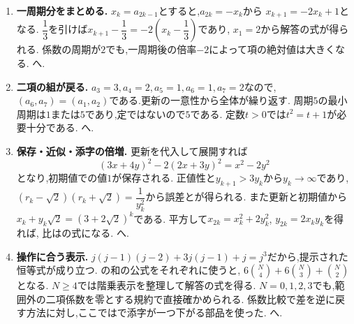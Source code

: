 \begin{enumerate}[label=\textbf{問\arabic*.},format=\bookitemlink{practice-connections}{solution}{problem}]
      へ.
    \item \textbf{一周期分をまとめる.}
      $x_k=a_{2k-1}$とすると,$a_{2k}=-x_k$から
      $x_{k+1}=-2x_k+1$となる.
      $\dfrac{1}{3}$を引けば$x_{k+1}-\dfrac{1}{3}=-2\left(x_k-\dfrac{1}{3}\right)$であり,
      $x_1=2$から解答の式が得られる.
      係数の周期が$2$でも,一周期後の倍率$-2$によって項の絶対値は大きくなる.
      へ.
    \item \textbf{二項の組が戻る.}
      $a_3=3,a_4=2,a_5=1,a_6=1,a_7=2$なので,
      $(a_6,a_7)=(a_1,a_2)$である.更新の一意性から全体が繰り返す.
      周期$5$の最小周期は$1$または$5$であり,定ではないので$5$である.
      定数$t>0$では$t^2=t+1$が必要十分である.
      へ.
    \item \textbf{保存・近似・添字の倍増.}
      更新を代入して展開すれば
      \[
        (3x+4y)^2-2(2x+3y)^2=x^2-2y^2
      \]
      となり,初期値での値$1$が保存される.
      正値性と$y_{k+1}>3y_k$から$y_k\to\infty$であり,
      $(r_k-\sqrt2)(r_k+\sqrt2)=\dfrac{1}{y_k^2}$から誤差とが得られる.
      また更新と初期値から$x_k+y_k\sqrt2=(3+2\sqrt2)^k$である.
      平方して$x_{2k}=x_k^2+2y_k^2$, $y_{2k}=2x_ky_k$を得れば,
      比はの式になる.
      へ.
    \item \textbf{操作に合う表示.}
      $j(j-1)(j-2)+3j(j-1)+j=j^3$だから,提示された恒等式が成り立つ.
      の和の公式をそれぞれに使うと,
      $6\binom N4+6\binom N3+\binom N2$となる.
      $N\ge4$では階乗表示を整理して解答の式を得る.
      $N=0,1,2,3$でも,範囲外の二項係数を零とする規約で直接確かめられる.
      係数比較で差を逆に戻す方法に対し,ここではで添字が一つ下がる部品を使った.
      へ.
  \end{enumerate}
